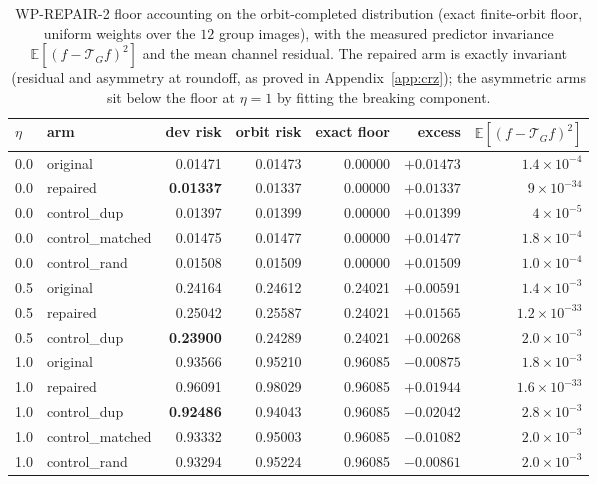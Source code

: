 \documentclass[11pt]{article}
\newcommand{\Tg}{\mathcal{T}_G}
\begin{document}
\begin{table}[t]
\centering
\caption{WP-REPAIR-2 floor accounting on the orbit-completed distribution (exact finite-orbit
floor, uniform weights over the $12$ group images), with the measured predictor invariance
$\mathbb{E}[(f-\Tg f)^2]$ and the mean channel residual. The repaired arm is exactly
invariant (residual and asymmetry at roundoff, as proved in Appendix~\ref{app:crz}); the
asymmetric arms sit below the floor at $\eta{=}1$ by fitting the breaking component.}
\label{tab:rep2floors}
\small
\begin{tabular}{@{}llrrrrr@{}}
\toprule
$\eta$ & arm & dev risk & orbit risk & exact floor & excess & $\mathbb{E}[(f-\Tg f)^2]$ \\
\midrule
0.0 & original & 0.01471 & 0.01473 & 0.00000 & $+0.01473$ & $1.4\times10^{-4}$ \\
0.0 & repaired & \textbf{0.01337} & 0.01337 & 0.00000 & $+0.01337$ & $9\times10^{-34}$ \\
0.0 & control\_dup & 0.01397 & 0.01399 & 0.00000 & $+0.01399$ & $4\times10^{-5}$ \\
0.0 & control\_matched & 0.01475 & 0.01477 & 0.00000 & $+0.01477$ & $1.8\times10^{-4}$ \\
0.0 & control\_rand & 0.01508 & 0.01509 & 0.00000 & $+0.01509$ & $1.0\times10^{-4}$ \\
\midrule
0.5 & original & 0.24164 & 0.24612 & 0.24021 & $+0.00591$ & $1.4\times10^{-3}$ \\
0.5 & repaired & 0.25042 & 0.25587 & 0.24021 & $+0.01565$ & $1.2\times10^{-33}$ \\
0.5 & control\_dup & \textbf{0.23900} & 0.24289 & 0.24021 & $+0.00268$ & $2.0\times10^{-3}$ \\
\midrule
1.0 & original & 0.93566 & 0.95210 & 0.96085 & $-0.00875$ & $1.8\times10^{-3}$ \\
1.0 & repaired & 0.96091 & 0.98029 & 0.96085 & $\mathbf{+0.01944}$ & $1.6\times10^{-33}$ \\
1.0 & control\_dup & \textbf{0.92486} & 0.94043 & 0.96085 & $-0.02042$ & $2.8\times10^{-3}$ \\
1.0 & control\_matched & 0.93332 & 0.95003 & 0.96085 & $-0.01082$ & $2.0\times10^{-3}$ \\
1.0 & control\_rand & 0.93294 & 0.95224 & 0.96085 & $-0.00861$ & $2.0\times10^{-3}$ \\
\bottomrule
\end{tabular}
\end{table}
\end{document}
